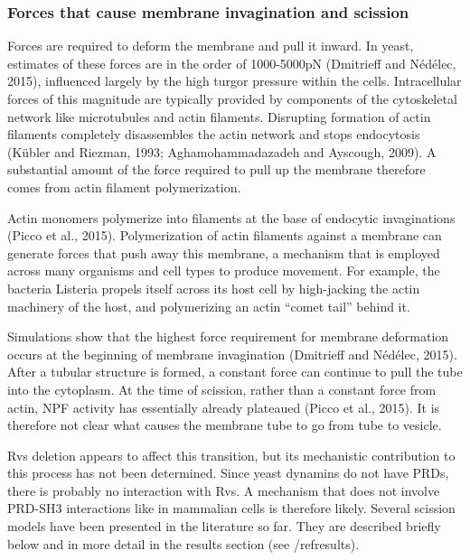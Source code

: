 \vspace{5mm}
		\subsubsection{Forces that cause membrane invagination and scission}
Forces are required to deform the membrane and pull it inward. In yeast, estimates of these forces are in the order of 1000-5000pN (Dmitrieff and Nédélec, 2015), influenced largely by the high turgor pressure within the cells. Intracellular forces of this magnitude are typically provided by components of the cytoskeletal network like microtubules and actin filaments. Disrupting formation of actin filaments completely disassembles the actin network and stops endocytosis (Kübler and Riezman, 1993; Aghamohammadazadeh and Ayscough, 2009). A substantial amount of the force required to pull up the membrane therefore comes from actin filament polymerization.

\vspace{5mm}
Actin monomers polymerize into filaments at the base of endocytic invaginations (Picco et al., 2015). Polymerization of actin filaments against a membrane can generate forces that push away this membrane, a mechanism that is employed across many organisms and cell types to produce movement. For example, the bacteria Listeria propels itself across its host cell by high-jacking the actin machinery of the host, and polymerizing an actin “comet tail” behind it. 

\vspace{5mm}
Simulations show that the highest force requirement for membrane deformation occurs at the beginning of membrane invagination (Dmitrieff and Nédélec, 2015). After a tubular structure is formed, a constant force can continue to pull the tube into the cytoplasm. At the time of scission, rather than a constant force from actin, NPF activity has essentially already plateaued (Picco et al., 2015). It is therefore not clear what causes the membrane tube to go from tube to vesicle.  

\vspace{5mm}
Rvs deletion appears to affect this transition, but its mechanistic contribution to this process has not been determined. Since yeast dynamins do not have PRDs, there is probably no interaction with Rvs. A mechanism that does not involve PRD-SH3 interactions like in mammalian cells is therefore likely. Several scission models have been presented in the literature so far. They are described briefly below and in more detail in the results section (see /ref{results}). 


